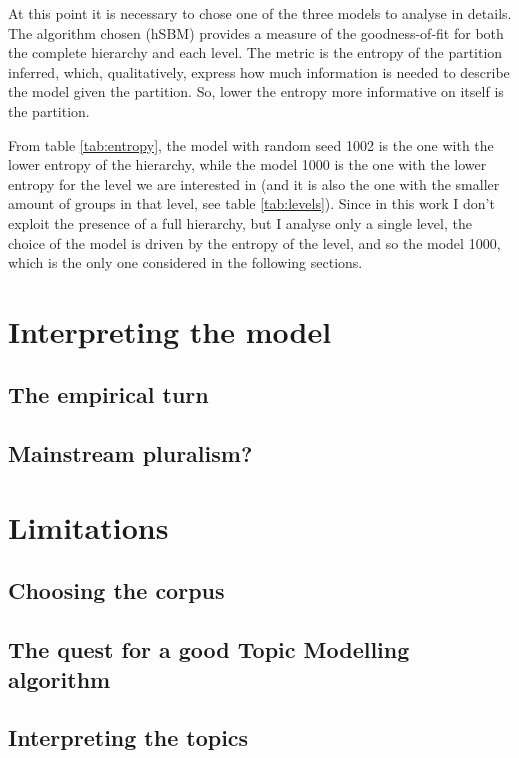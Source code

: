 \documentclass[a4paper, 11pt, headings=standardclasses, tablecaptionsbelow]{scrartcl}
\begin{document}


At this point it is necessary to chose one of the three models to analyse in details. The algorithm chosen (hSBM) provides a measure of the goodness-of-fit for both the complete hierarchy and each level. The metric is the entropy of the partition inferred, which, qualitatively, express how much information is needed to describe the model given the partition. So, lower the entropy more informative on itself is the partition.

From table \ref{tab:entropy}, the model with random seed 1002 is the one with the lower entropy of the hierarchy, while the model 1000 is the one with the lower entropy for the level we are interested in (and it is also the one with the smaller amount of groups in that level, see table \ref{tab:levels}). Since in this work I don't exploit the presence of a full hierarchy, but I analyse only a single level, the choice of the model is driven by the entropy of the level, and so the model 1000, which is the only one considered in the following sections.

\section{Interpreting the model}

\subsection{The empirical turn}

\subsection{Mainstream pluralism?}

\section{Limitations}
\subsection{Choosing the corpus}

\subsection{The quest for a good Topic Modelling algorithm}

\subsection{Interpreting the topics}
\end{document}
